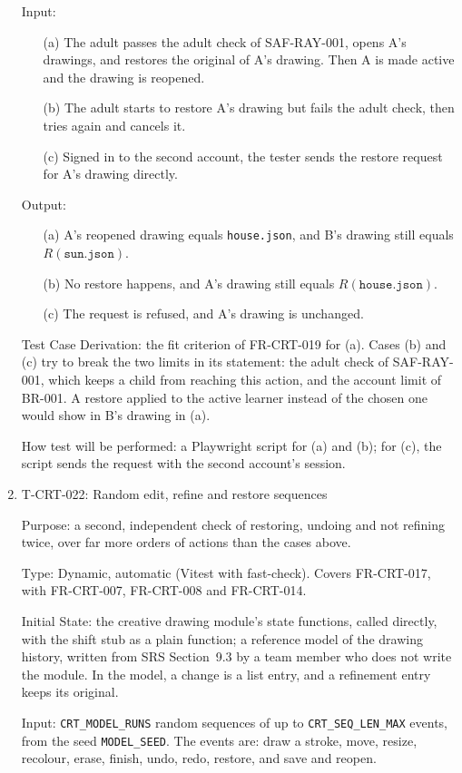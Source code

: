 \documentclass[12pt, titlepage]{article}
\newcommand{\testitem}[1]{\item #1\par\nopagebreak}
\begin{document}
\begin{enumerate}
Input:
\begin{itemize}
\item[(a)] The adult passes the adult check of SAF-RAY-001, opens A's
drawings, and restores the original of A's drawing. Then A is made active
and the drawing is reopened.
\item[(b)] The adult starts to restore A's drawing but fails the adult
check, then tries again and cancels it.
\item[(c)] Signed in to the second account, the tester sends the restore
request for A's drawing directly.
\end{itemize}

Output:
\begin{itemize}
\item[(a)] A's reopened drawing equals \texttt{house.json}, and B's drawing
still equals $R(\texttt{sun.json})$.
\item[(b)] No restore happens, and A's drawing still equals
$R(\texttt{house.json})$.
\item[(c)] The request is refused, and A's drawing is unchanged.
\end{itemize}

Test Case Derivation: the fit criterion of FR-CRT-019 for (a). Cases (b) and
(c) try to break the two limits in its statement: the adult check of
SAF-RAY-001, which keeps a child from reaching this action, and the account
limit of BR-001. A restore applied to the active learner instead of the
chosen one would show in B's drawing in (a).

How test will be performed: a Playwright script for (a) and (b); for (c),
the script sends the request with the second account's session.

\testitem{T-CRT-022: Random edit, refine and restore sequences}

Purpose: a second, independent check of restoring, undoing and not
refining twice, over far more orders of actions than the cases above.

Type: Dynamic, automatic (Vitest with fast-check). Covers FR-CRT-017, with
FR-CRT-007, FR-CRT-008 and FR-CRT-014.

Initial State: the creative drawing module's state functions, called
directly, with the shift stub as a plain function; a reference model of the
drawing history, written from SRS Section~9.3 by a team member who does not
write the module. In the model, a change is a list entry, and a refinement
entry keeps its original.

Input: \texttt{CRT\_MODEL\_RUNS} random sequences of up to
\texttt{CRT\_SEQ\_LEN\_MAX} events, from the seed \texttt{MODEL\_SEED}. The
events are: draw a stroke, move, resize, recolour, erase, finish, undo,
redo, restore, and save and reopen.


\end{enumerate}
\end{document}
